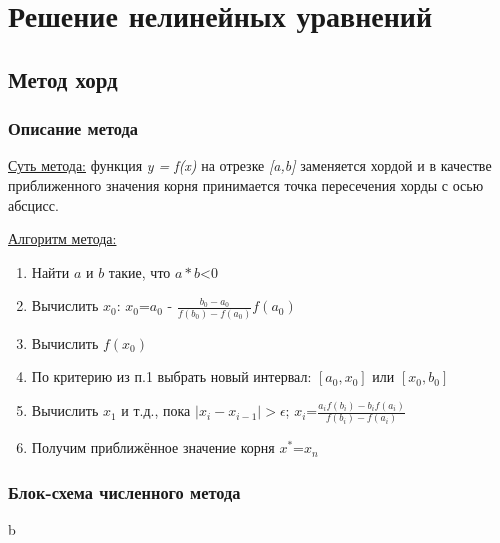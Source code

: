 \tableofcontents

\newpage

\section{Решение нелинейных уравнений}

\subsection{Метод хорд}

\subsubsection{Описание метода}
\underline{Суть метода:} функция \textit{y = f(x)} на отрезке \textit{[a,b]} заменяется хордой и в качестве приближенного
значения корня принимается точка пересечения хорды с осью абсцисс.


\underline{Алгоритм метода:}
\begin{enumerate}
    \item Найти $a$ и $b$ такие, что $a*b$<$0$
    \item Вычислить $x_0$:  $x_0$=$a_0$ - $\frac{b_0-a_0}{f(b_0)-f(a_0)}$$f(a_0)$
    \item Вычислить $f(x_0)$
    \item По критерию из п.1 выбрать новый интервал: $[a_0,x_0]$ или $[x_0,b_0]$
    \item Вычислить $x_1$ и т.д., пока $|x_i - x_{i-1}|>\epsilon$; $x_i$=$\frac{a_{i}f(b_i)-b_{i}f(a_i)}{f(b_i)-f(a_i)}$
    \item Получим приближённое значение корня $x^*$=$x_n$
\end{enumerate}

\subsubsection{Блок-схема численного метода}
b%

